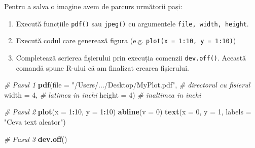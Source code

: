 \documentclass[]{article}
\newenvironment{Shaded}{\begin{snugshade}}{\end{snugshade}}
\newcommand{\KeywordTok}[1]{\textcolor[rgb]{0.13,0.29,0.53}{\textbf{#1}}}
\newcommand{\DataTypeTok}[1]{\textcolor[rgb]{0.13,0.29,0.53}{#1}}
\newcommand{\DecValTok}[1]{\textcolor[rgb]{0.00,0.00,0.81}{#1}}
\newcommand{\StringTok}[1]{\textcolor[rgb]{0.31,0.60,0.02}{#1}}
\newcommand{\CommentTok}[1]{\textcolor[rgb]{0.56,0.35,0.01}{\textit{#1}}}
\newcommand{\OperatorTok}[1]{\textcolor[rgb]{0.81,0.36,0.00}{\textbf{#1}}}
\newcommand{\NormalTok}[1]{#1}
\providecommand{\tightlist}{%
  \setlength{\itemsep}{0pt}\setlength{\parskip}{0pt}}
\begin{document}
Pentru a salva o imagine avem de parcurs următorii pași:

\begin{enumerate}
\def\labelenumi{\arabic{enumi}.}
\tightlist
\item
  Execută funcțiile \texttt{pdf()} sau \texttt{jpeg()} cu argumentele
  \texttt{file,\ width,\ height}.
\item
  Execută codul care generează figura (e.g.
  \texttt{plot(x\ =\ 1:10,\ y\ =\ 1:10)})
\item
  Completează scrierea fișierului prin execuția comenzii
  \texttt{dev.off()}. Această comandă spune R-ului că am finalizat
  crearea fișierului.
\end{enumerate}

\begin{Shaded}
\begin{Highlighting}[]
\CommentTok{# Pasul 1}
\KeywordTok{pdf}\NormalTok{(}\DataTypeTok{file =} \StringTok{"/Users/.../Desktop/MyPlot.pdf"}\NormalTok{,   }\CommentTok{# directorul cu fisierul }
    \DataTypeTok{width =} \DecValTok{4}\NormalTok{, }\CommentTok{# latimea in inchi}
    \DataTypeTok{height =} \DecValTok{4}\NormalTok{) }\CommentTok{# inaltimea in inchi}

\CommentTok{# Pasul 2}
\KeywordTok{plot}\NormalTok{(}\DataTypeTok{x =} \DecValTok{1}\OperatorTok{:}\DecValTok{10}\NormalTok{, }
     \DataTypeTok{y =} \DecValTok{1}\OperatorTok{:}\DecValTok{10}\NormalTok{)}
\KeywordTok{abline}\NormalTok{(}\DataTypeTok{v =} \DecValTok{0}\NormalTok{) }
\KeywordTok{text}\NormalTok{(}\DataTypeTok{x =} \DecValTok{0}\NormalTok{, }\DataTypeTok{y =} \DecValTok{1}\NormalTok{, }\DataTypeTok{labels =} \StringTok{"Ceva text aleator"}\NormalTok{)}

\CommentTok{# Pasul 3}
\KeywordTok{dev.off}\NormalTok{()}
\end{Highlighting}
\end{Shaded}
\end{document}
